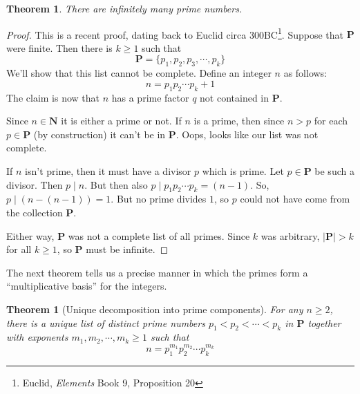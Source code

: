 \documentclass[12pt]{article}
\numberwithin{equation}{subsection}
\newtheorem{thm}[subsection]{Theorem}
\theoremstyle{note}
\begin{document}
\begin{thm} \label{lotta-primes}
	There are infinitely many prime numbers.
\end{thm}

{\begin{proof}
	This is a recent proof, dating back to Euclid circa 300BC\footnote{Euclid, \textit{Elements} Book 9, Proposition 20}. Suppose that $\mathbf{P}$ were finite. Then there is $k\geq 1$ such that \[ \mathbf{P}=\{p_1,p_2,p_3,\cdots,p_k\}\] We'll show that this list cannot be complete. Define an integer $n$ as follows: \[n = p_1p_2\cdots p_k +1\]  The claim is now that $n$ has a prime factor $q$ not contained in $\mathbf{P}$. 
	
	Since $n\in\mathbf{N}$ it is either a prime or not. If $n$ is a prime, then since $n>p$ for each $p\in\mathbf{P}$ (by construction) it can't be in $\mathbf{P}$. Oops, looks like our list was not complete. 
	
	If $n$ isn't prime, then it must have a divisor $p$ which is prime. Let $p\in \mathbf{P}$ be such a divisor. Then $p\mid n$. But then also $p\mid p_1p_2\cdots p_k=(n-1)$. So, $p\mid (n-(n-1))=1$. But no prime divides $1$, so $p$ could not have come from the collection $\mathbf{P}$. 
	
	Either way, $\mathbf{P}$ was not a complete list of all primes. Since $k$ was arbitrary, $| \mathbf{P} |> k$ for all $k\geq 1$, so $\mathbf{P}$ must be infinite. 
\end{proof}}

The next theorem tells us a precise manner in which the primes form a ``multiplicative basis'' for the integers.

\begin{thm}[Unique decomposition into prime components] \label{fta}
	For any $n\geq 2$, there is a unique list of distinct prime numbers $p_1<p_2< \cdots< p_k$ in $\mathbf{P}$ together with exponents $m_1,m_2, \cdots,m_k\geq 1$ such that \[n=p_1^{m_1}p_2^{m_2}\cdots p_k^{m_k}\]
\end{thm}
\end{document}
